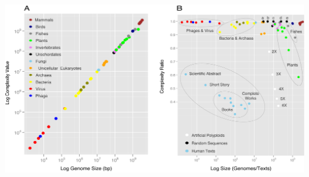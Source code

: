 \begin{FPfigure}
\centering 
\includegraphics[width=\textwidth]{tex_source/figures/dna_struct/genome_complexity.png}

\end{FPfigure}
